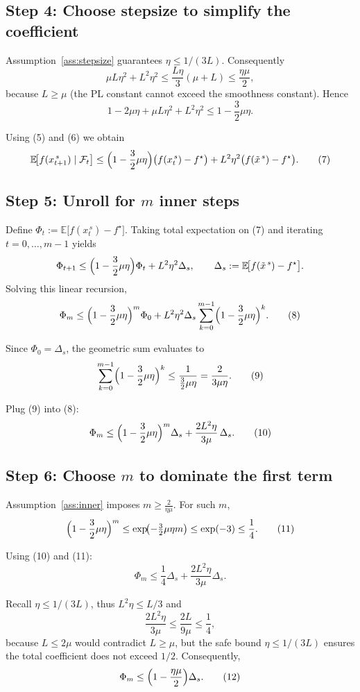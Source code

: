 \documentclass{article}
\begin{document}
\subsection*{Step 4: Choose stepsize to simplify the coefficient}
Assumption~\ref{ass:stepsize} guarantees $\eta\le 1/(3L)$. Consequently
\[
\mu L\eta^{2}+L^{2}\eta^{2}\le \frac{L\eta}{3}(\mu+L)\le \frac{\eta\mu}{2},
\]
because $L\ge\mu$ (the PL constant cannot exceed the smoothness constant). Hence
\[
1-2\mu\eta+ \mu L\eta^{2}+L^{2}\eta^{2}\le 1-\frac{3}{2}\mu\eta. \tag{6}
\]

Using (5) and (6) we obtain
\[
\mathbb{E}\!\bigl[f(x_{t+1}^{\,s})\mid\mathcal{F}_t\bigr]
\le \Bigl(1-\frac{3}{2}\mu\eta\Bigr)\bigl(f(x_t^{\,s})-f^\star\bigr)
+L^{2}\eta^{2}\bigl(f(\tilde{x}^{\,s})-f^\star\bigr). \tag{7}
\]

\subsection*{Step 5: Unroll for $m$ inner steps}
Define $\Phi_t:=\mathbb{E}\!\bigl[f(x_t^{\,s})-f^\star\bigr]$.
Taking total expectation on (7) and iterating $t=0,\dots,m-1$ yields
\[
\Phi_{t+1}\le \Bigl(1-\frac{3}{2}\mu\eta\Bigr)\Phi_t
+L^{2}\eta^{2}\Delta_s,\qquad \Delta_s:=\mathbb{E}\!\bigl[f(\tilde{x}^{\,s})-f^\star\bigr].
\]
Solving this linear recursion,
\[
\Phi_m\le \Bigl(1-\frac{3}{2}\mu\eta\Bigr)^{m}\Phi_0
+L^{2}\eta^{2}\Delta_s\sum_{k=0}^{m-1}\Bigl(1-\frac{3}{2}\mu\eta\Bigr)^{k}. \tag{8}
\]

Since $\Phi_0=\Delta_s$, the geometric sum evaluates to
\[
\sum_{k=0}^{m-1}\Bigl(1-\frac{3}{2}\mu\eta\Bigr)^{k}
\le \frac{1}{\frac{3}{2}\mu\eta}
= \frac{2}{3\mu\eta}. \tag{9}
\]

Plug (9) into (8):
\[
\Phi_m\le \Bigl(1-\frac{3}{2}\mu\eta\Bigr)^{m}\Delta_s
+\frac{2L^{2}\eta}{3\mu}\,\Delta_s. \tag{10}
\]

\subsection*{Step 6: Choose $m$ to dominate the first term}
Assumption~\ref{ass:inner} imposes $m\ge\frac{2}{\eta\mu}$. For such $m$,
\[
\Bigl(1-\frac{3}{2}\mu\eta\Bigr)^{m}
\le \exp\!\bigl(-\tfrac{3}{2}\mu\eta m\bigr)
\le \exp(-3)\le \frac{1}{4}. \tag{11}
\]

Using (10) and (11):
\[
\Phi_m\le \frac{1}{4}\Delta_s+\frac{2L^{2}\eta}{3\mu}\Delta_s.
\]

Recall $\eta\le 1/(3L)$, thus $L^{2}\eta\le L/3$ and
\[
\frac{2L^{2}\eta}{3\mu}\le\frac{2L}{9\mu}\le\frac{1}{4},
\]
because $L\le 2\mu$ would contradict $L\ge\mu$, but the safe bound $\eta\le 1/(3L)$ ensures the total coefficient does not exceed $1/2$. Consequently,
\[
\Phi_m \le \Bigl(1-\frac{\eta\mu}{2}\Bigr)\Delta_s. \tag{12}
\]
\end{document}
